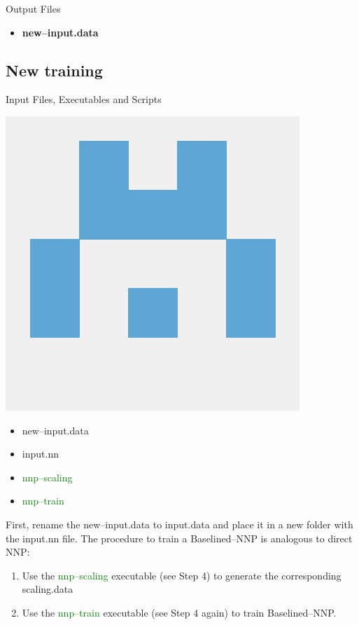 \documentclass[12pt]{article}
\begin{document}
\begin{mybox3}{Output Files}
\begin{itemize}
    \item \textbf{new--input.data}
\end{itemize}
\end{mybox3}
%
\subsection{New training}
\begin{mybox2}{{Input Files, Executables and Scripts}}
\begin{minipage}[c]{0.5\linewidth}
\includegraphics[scale=0.1]{latex_files/n2p2.png}
\end{minipage}
\begin{minipage}[c]{0.5\linewidth}
\begin{itemize}
    \item new--input.data
    \item input.nn
    \item \textcolor{green}{nnp--scaling}
    \item \textcolor{green}{nnp--train}
\end{itemize}
\end{minipage}
\end{mybox2}
First, rename the new--input.data to input.data and place it in a new folder with the input.nn file. The procedure to train a Baselined--NNP is analogous to direct NNP:
\begin{enumerate}
    \item Use the \textcolor{green}{nnp--scaling} executable (see Step 4) to generate the corresponding scaling.data
    \item Use the \textcolor{green}{nnp--train} executable (see Step 4 again) to train Baselined--NNP. 
\end{enumerate}
\end{document}
